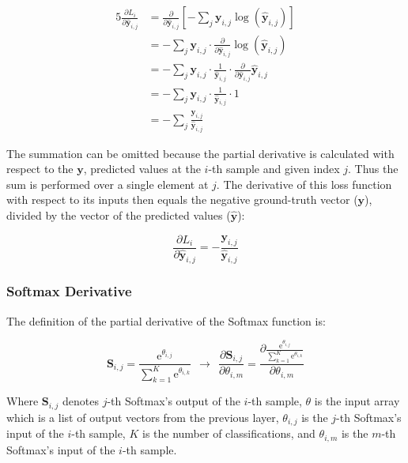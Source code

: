 \documentclass[a4paper]{report}
\newcommand{\euler}{\mathrm{e}}
\newcommand{\matr}[1]{\mathbf{#1}}
\newcommand{\vect}[1]{\bm{#1}}
\begin{document}
\begin{alignat*}{5}
    \frac{\partial L_i}{\partial \vect{\hat{y}}_{i,j}} &= \frac{\partial}{\partial \vect{\hat{y}}_{i,j}} [-\sum_j \vect{y}_{i,j} \log(\vect{\hat{y}}_{i,j})] \\
    &= -\sum_j \vect{y}_{i,j} \cdot \frac{\partial}{\partial \vect{\hat{y}}_{i,j}} \log(\vect{\hat{y}}_{i,j}) \\
    &= -\sum_j \vect{y}_{i,j} \cdot \frac{1}{\vect{\hat{y}}_{i,j}} \cdot \frac{\partial}{\partial \vect{\hat{y}}_{i,j}} \vect{\hat{y}}_{i,j} \\
    &= -\sum_j \vect{y}_{i,j} \cdot \frac{1}{\vect{\hat{y}}_{i,j}} \cdot 1 \\
    &= -\sum_j \frac{\vect{y}_{i,j}}{\vect{\hat{y}}_{i,j}}
\end{alignat*}

The summation can be omitted because the partial derivative is calculated with respect to the $\vect{y}$, predicted values at the $i$-th sample and given index $j$. Thus the sum is performed over a single element at $j$. The derivative of this loss function with respect to its inputs then equals the negative ground-truth vector ($\vect{y}$), divided by the vector of the predicted values ($\vect{\hat{y}}$):

\begin{equation*}
    \frac{\partial L_i}{\partial \vect{\hat{y}}_{i,j}} = -\frac{\vect{y}_{i,j}}{\vect{\hat{y}}_{i,j}}
\end{equation*}

\subsubsection*{Softmax Derivative}
The definition of the partial derivative of the Softmax function is:

\begin{equation*}
    \matr{S}_{i,j} = \frac{\euler^{\theta_{i,j}}}{\sum_{k=1}^K \euler^{\theta_{i,k}}} ~~ \rightarrow ~~ \frac{\partial \matr{S}_{i,j}}{\partial \theta_{i,m}} = \frac{\partial \frac{\euler^{\theta_{i,j}}}{\sum_{k=1}^{K} \euler^{\theta_{i,k}}}}{\partial \theta_{i,m}}
\end{equation*}

Where $\matr{S}_{i,j}$ denotes $j$-th Softmax's output of the $i$-th sample, $\theta$ is the input array which is a list of output vectors from the previous layer, $\theta_{i,j}$ is the $j$-th Softmax's input of the $i$-th sample, $K$ is the number of classifications, and $\theta_{i,m}$ is the $m$-th Softmax's input of the $i$-th sample.
\end{document}
